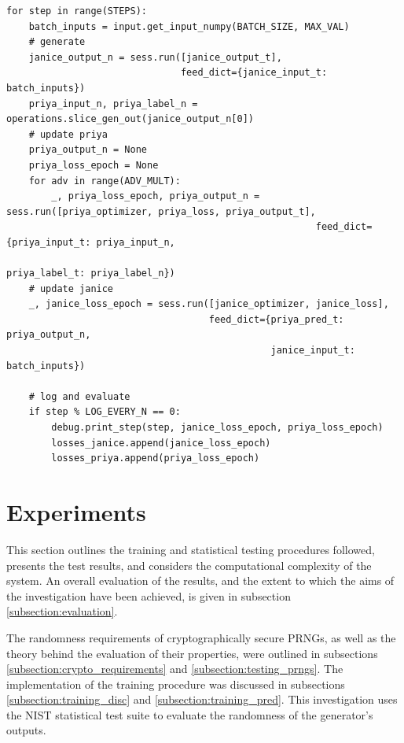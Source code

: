 \documentclass[12pt, titlepage]{report}
\theoremstyle{definition}
\begin{document}
\begin{verbatim}
for step in range(STEPS):
    batch_inputs = input.get_input_numpy(BATCH_SIZE, MAX_VAL)
    # generate
    janice_output_n = sess.run([janice_output_t],
                               feed_dict={janice_input_t: batch_inputs})
    priya_input_n, priya_label_n = operations.slice_gen_out(janice_output_n[0])
    # update priya
    priya_output_n = None
    priya_loss_epoch = None
    for adv in range(ADV_MULT):
        _, priya_loss_epoch, priya_output_n = sess.run([priya_optimizer, priya_loss, priya_output_t],
                                                       feed_dict={priya_input_t: priya_input_n,
                                                                  priya_label_t: priya_label_n})
    # update janice
    _, janice_loss_epoch = sess.run([janice_optimizer, janice_loss],
                                    feed_dict={priya_pred_t: priya_output_n,
                                               janice_input_t: batch_inputs})

    # log and evaluate
    if step % LOG_EVERY_N == 0:
        debug.print_step(step, janice_loss_epoch, priya_loss_epoch)
        losses_janice.append(janice_loss_epoch)
        losses_priya.append(priya_loss_epoch)
\end{verbatim}



\chapter{Experiments}\label{chapter:experiments}
This section outlines the training and statistical testing procedures followed, presents the test results, and considers the computational complexity of the system. An overall evaluation of the results, and the extent to which the aims of the investigation have been achieved, is given in subsection \ref{subsection:evaluation}.

The randomness requirements of cryptographically secure PRNGs, as well as the theory behind the evaluation of their properties, were outlined in subsections \ref{subsection:crypto_requirements} and \ref{subsection:testing_prngs}. The implementation of the training procedure was discussed in subsections \ref{subsection:training_disc} and \ref{subsection:training_pred}. This investigation uses the NIST statistical test suite to evaluate the randomness of the generator's outputs.
\end{document}
